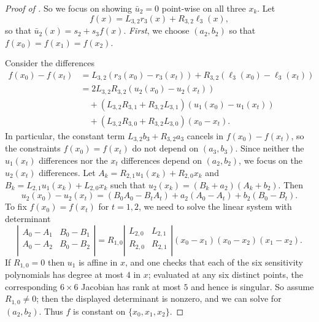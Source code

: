 \begin{proof}[Proof of ]
So we focus on showing $\bar u_2 = 0$ point-wise on all three $x_k$.
Let
\[
   f(x) = L_{3,2} r_3(x) + R_{3,2} \ell_3(x),
\]
so that $\bar u_2(x)=s_2+s_3 f(x)$.
\emph{First}, we choose $(a_2,b_2)$ so that $f(x_0)=f(x_1)=f(x_2)$.

Consider the differences
\begin{align}
   f(x_0) - f(x_t)
   &= L_{3,2} (r_3(x_0) - r_3(x_t)) + R_{3,2} (\ell_3(x_0) - \ell_3(x_t))
 \\&=
   2 L_{3,2} R_{3,2} (u_2(x_0) - u_2(x_t))
 \\&\quad
   + (L_{3,2} R_{3,1} + R_{3,2} L_{3,1}) (u_1(x_0) - u_1(x_t))
 \\&\quad
   + (L_{3,2} R_{3,0} + R_{3,2} L_{3,0}) (x_0 - x_t)
   .
\end{align}
In particular, the constant term $L_{3,2}b_3+R_{3,2}a_3$ cancels in $f(x_0)-f(x_t)$, so the constraints $f(x_0)=f(x_t)$ do not depend on $(a_3,b_3)$.
Since neither the $u_1(x_t)$ differences nor the $x_t$ differences depend on $(a_2,b_2)$, we focus on the $u_2(x_t)$ differences.
Let $A_k = R_{2,1} u_1(x_k) + R_{2,0} x_k$ and
$B_k = L_{2,1} u_1(x_k) + L_{2,0} x_k$ such that $u_2(x_k) = (B_k + a_2)(A_k + b_2)$.
Then
\[
   u_2(x_0) - u_2(x_t)
   = (B_0 A_0 - B_t A_t) + a_2 (A_0 - A_t) + b_2 (B_0 - B_t)
   .
\]
To fix $f(x_0) = f(x_t)$ for $t=1,2$, we need to solve the linear system with determinant
\[
   \left|
   \begin{matrix}
      A_0 - A_1 & B_0 - B_1 \\
      A_0 - A_2 & B_0 - B_2 \\
   \end{matrix}
   \right|
   = R_{1,0}
   \left|
   \begin{matrix}
      L_{2,0} & L_{2,1} \\
      R_{2,0} & R_{2,1} \\
   \end{matrix}
   \right|
   (x_0 - x_1)(x_0 - x_2)(x_1 - x_2)
   .
\]
If $R_{1,0}=0$ then $u_1$ is affine in $x$, and one checks that each of the six sensitivity polynomials has degree at most $4$ in $x$; evaluated at any six distinct points, the corresponding $6\times 6$ Jacobian has rank at most $5$ and hence is singular.
So assume $R_{1,0}\neq 0$; then the displayed determinant is nonzero, and we can solve for $(a_2,b_2)$.
Thus $f$ is constant on $\{x_0,x_1,x_2\}$.


\end{proof}
